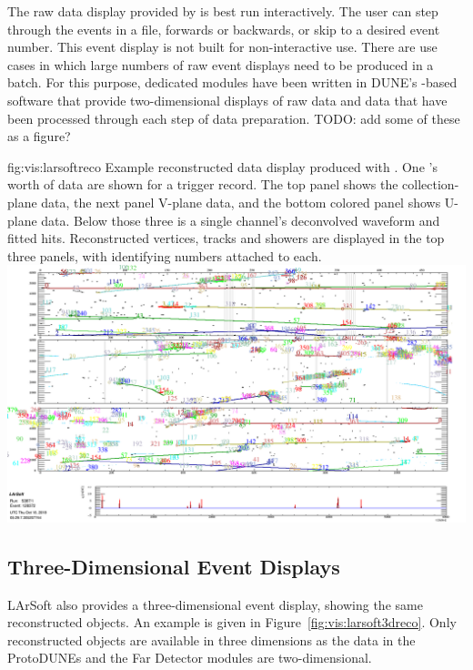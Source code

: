 \documentclass[../main-v1.tex]{subfiles}
\begin{document}
The raw data display provided by  is best run interactively.  The user can step through the events in a file, forwards or backwards, or skip to a desired event number.  This event display is not built for non-interactive use.  There are use cases in which large numbers of raw event displays need to be produced in a batch.  For this purpose, dedicated modules have been written in DUNE's -based software that provide two-dimensional displays of raw data and data that have been processed through each step of data preparation.  {\color{red} TODO:  add some of these as a figure?}

\begin{dunefigure}
{fig:vis:larsoftreco} 
{Example reconstructed data display produced with .  One 's worth of data are shown for a  trigger record. The top panel shows the collection-plane data, the next panel V-plane data, and the bottom colored panel shows U-plane data.  Below those three is a single channel's deconvolved waveform and fitted hits.  Reconstructed vertices, tracks and showers are displayed in the top three panels, with identifying numbers attached to each.}
\includegraphics[width=0.9 \textwidth]{graphics/EventDisplays/larsoft_reco_example_evd.png}
\end{dunefigure}


\subsection{Three-Dimensional Event Displays}
\label{sec:visualization:3d}

 LArSoft also provides a three-dimensional event display, showing the same reconstructed objects.  An example is given in Figure~\ref{fig:vis:larsoft3dreco}.  Only reconstructed objects are available in three dimensions as the data in the ProtoDUNEs and the Far Detector modules are two-dimensional.
 
\end{document}
